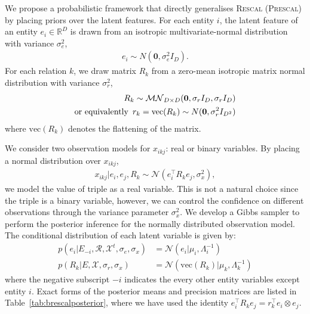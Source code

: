 We propose a probabilistic framework that directly generalises \textsc{Rescal} (\textsc{Prescal})
by placing priors over the
latent features. For each entity $i$, the latent feature of an entity $e_i \in
\mathbb{R}^{D}$ is drawn from an isotropic multivariate-normal distribution with variance $\sigma_e^2$,
\begin{align}
\label{eqn:entity_gen}
e_i \sim {N}(\mathbf{0}, \sigma_e^2{I}_D).
\end{align}
For each relation $k$, we draw matrix $R_k$ from
a zero-mean isotropic matrix normal distribution with variance $\sigma_r^2$,
\begin{align}
\label{eqn:relation_gen}
R_k \sim \mathcal{MN}_{D \times D}(\mathbf{0}, \sigma_r{I}_D, \sigma_r{I}_D) \\
\text{or equivalently}\enspace r_k  = \text{vec}(R_k) \sim N(\mathbf{0}, \sigma_r^2 I_{D^2}) \notag
\end{align}
where $\text{vec}(R_k)$ denotes the flattening of the matrix.

 We consider two observation models for $x_{ikj}$: real or binary variables. By placing a
normal distribution over $x_{ikj}$,
\begin{align}
  x_{ikj} |e_i, e_j, R_k \sim \mathcal{N}(e_i^{\top} R_k e_j, \sigma_x^2),\label{eqn:triple_gen}
\end{align}
we model the value of triple as a real variable.
This is not a natural choice since the triple is a binary variable, however, we can control the confidence on different observations
through the variance parameter $\sigma_x^2$.
We develop a Gibbs sampler to perform the posterior inference for the normally distributed observation model. The conditional distribution of each latent variable is given by:
\begin{align}
p(e_i |E_{-i}, \mathcal{R}, \mathcal{X}^{t}, \sigma_e, \sigma_x) &= \mathcal{N}(e_i | \mu_i,
\Lambda_i^{-1})  \label{eqn:sample_e} \\
p(R_k|E, \mathcal{X}, \sigma_r, \sigma_x) &= \mathcal{N}(\text{vec}(R_k) |
\mu_k, \Lambda_k^{-1}) \label{eqn:sample_r}
\end{align}
where the negative subscript $-i$ indicates the every other entity variables except entity $i$.
Exact forms of the posterior means and precision matrices are listed in Table~\ref{tab:brescalposterior}, where we have
used the identity $e_i^{\top} R_k e_j = r_k^{\top} e_i \otimes e_j$.

